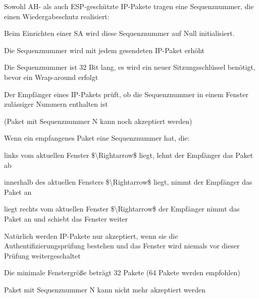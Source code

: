\documentclass[a4paper]{article}
\begin{document}
\begin{multicols}{3}
      \begin{itemize*}
            \item Sowohl AH- als auch ESP-geschützte IP-Pakete tragen eine
            Sequenznummer, die einen Wiedergabeschutz realisiert:
            \begin{itemize*}
                  \item Beim Einrichten einer SA wird diese Sequenznummer auf Null initialisiert.
                  \item Die Sequenznummer wird mit jedem gesendeten IP-Paket erhöht
                  \item Die Sequenznummer ist 32 Bit lang, es wird ein neuer Sitzungsschlüssel benötigt, bevor ein Wrap-around erfolgt
                  \item Der Empfänger eines IP-Pakets prüft, ob die Sequenznummer in einem Fenster zulässiger Nummern enthalten ist
                  \begin{itemize*} \item (Paket mit Sequenznummer N kann noch akzeptiert werden) \end{itemize*}
            \end{itemize*}
            \item Wenn ein empfangenes Paket eine Sequenznummer hat, die:
            \begin{itemize*}
                  \item links vom aktuellen Fenster \$\textbackslash Rightarrow\$ liegt, lehnt der Empfänger das Paket ab
                  \item innerhalb des aktuellen Fensters \$\textbackslash Rightarrow\$ liegt, nimmt der Empfänger das Paket an
                  \item liegt rechts vom aktuellen Fenster \$\textbackslash Rightarrow\$ der Empfänger nimmt das Paket an und schiebt das Fenster weiter
                  \item Natürlich werden IP-Pakete nur akzeptiert, wenn sie die Authentifizierungsprüfung bestehen und das Fenster wird niemals vor dieser Prüfung weitergeschaltet
            \end{itemize*}
            \item Die minimale Fenstergröße beträgt 32 Pakete (64 Pakete werden
            empfohlen)
            \begin{itemize*}
                  \item Paket mit Sequenznummer N kann nicht mehr akzeptiert werden
            \end{itemize*}
      \end{itemize*}



\end{multicols}
\end{document}
